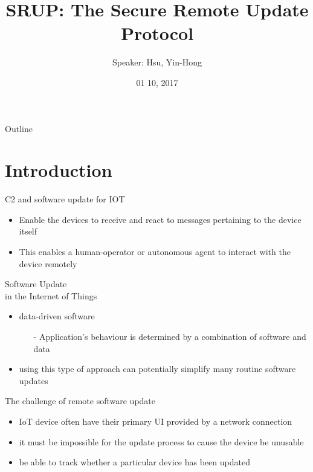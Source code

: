 \documentclass{beamer}
\title {
    SRUP: The Secure Remote Update Protocol\cite{eps402143}
}
\author {
    Speaker: Hsu, Yin-Hong
}
\date {
    01 10, 2017 %
}
\begin{document}
\begin{frame}
    \titlepage
\end{frame}


\begin{frame}{Outline}
    \tableofcontentsgather
    \tableofcontents
\end{frame}

\section{Introduction}

\begin{frame}{C2 and software update for IOT}
    \begin{itemize}
        \item {Enable the devices to receive and react to messages pertaining to the device itself}
        \item {This enables a human-operator or autonomous agent to interact with the device remotely}
    \end{itemize}
\end{frame}

\begin{frame}{Software Update \\ in the Internet of Things}
    \begin{itemize}
        \item {data-driven software}
        \begin{itemize}
            \item[-] Application's behaviour is determined by a combination of software and data
        \end{itemize}
        \item {using this type of approach can potentially simplify  many routine software updates}
    \end{itemize}
\end{frame}

\begin{frame}{The challenge of remote software update}
    \begin{itemize}
        \item{IoT device often have their primary UI provided by a network connection}
        \item{it must be impossible for the update process to cause the device be unusable}
        \item{be able to track whether a particular device has been updated}
    \end{itemize}
\end{frame}
\end{document}
